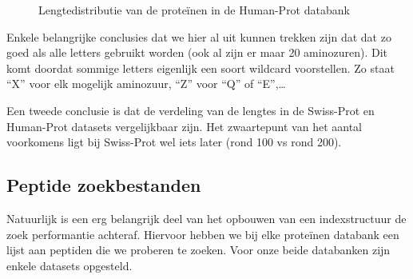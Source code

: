 \documentclass[11pt,dutch,faculty=we,layout=titlefont,underline=false,titleUppercase=true,titleUnderline=true]{ugent2016-report}
\begin{document}
    \begin{figure}[H]
        \centering
        \caption{Lengtedistributie van de proteïnen in de Human-Prot databank}\label{fig:humanprot_length}
    \end{figure}

    Enkele belangrijke conclusies dat we hier al uit kunnen trekken zijn dat dat zo goed als alle letters gebruikt worden (ook al zijn er maar 20 aminozuren).
    Dit komt doordat sommige letters eigenlijk een soort wildcard voorstellen.
    Zo staat ``X'' voor elk mogelijk aminozuur, ``Z'' voor ``Q'' of ``E'',\ldots

    Een tweede conclusie is dat de verdeling van de lengtes in de Swiss-Prot en Human-Prot datasets vergelijkbaar zijn.
    Het zwaartepunt van het aantal voorkomens ligt bij Swiss-Prot wel iets later (rond 100 vs rond 200).

    \subsection{Peptide zoekbestanden}\label{subsec:peptide-zoek-bestanden}
    Natuurlijk is een erg belangrijk deel van het opbouwen van een indexstructuur de zoek performantie achteraf.
    Hiervoor hebben we bij elke proteïnen databank een lijst aan peptiden die we proberen te zoeken.
    Voor onze beide databanken zijn enkele datasets opgesteld.
\end{document}
